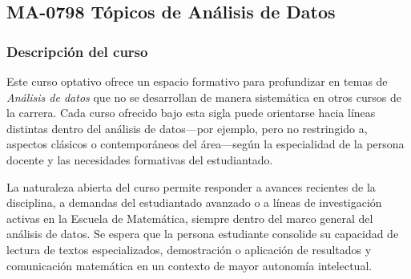 \newpage
\subsection*{MA-0798 Tópicos de Análisis de Datos}

\hypertarget{MA0798}{}
\begin{refsection}
\begin{table}[H]
\end{table}

\subsubsection*{Descripción del curso}

Este curso optativo ofrece un espacio formativo para profundizar en temas de \emph{Análisis de datos} que no se desarrollan de manera sistemática en otros cursos de la carrera. Cada curso ofrecido bajo esta sigla puede orientarse hacia líneas distintas dentro del análisis de datos---por ejemplo, pero no restringido a, aspectos clásicos o contemporáneos del área---según la especialidad de la persona docente y las necesidades formativas del estudiantado.

La naturaleza abierta del curso permite responder a avances recientes de la disciplina, a demandas del estudiantado avanzado o a líneas de investigación activas en la Escuela de Matemática, siempre dentro del marco general del análisis de datos. Se espera que la persona estudiante consolide su capacidad de lectura de textos especializados, demostración o aplicación de resultados y comunicación matemática en un contexto de mayor autonomía intelectual.


\end{refsection}
